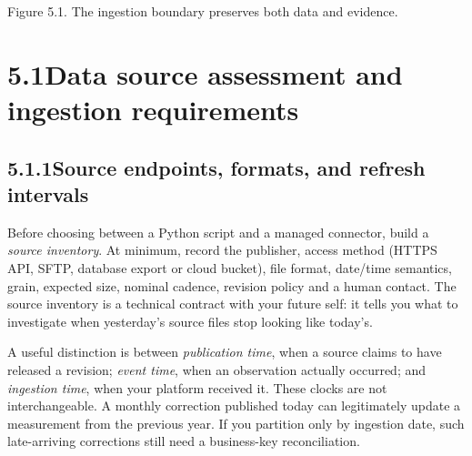 \documentclass[11pt,twoside]{article}
\newcommand{\topic}[2]{\subsection*{#1\quad #2}}
\begin{document}
\begin{center}
\par{\fontsize{8}{10}\selectfont\color{inkgray}Figure 5.1. The ingestion boundary preserves both data and evidence.}\end{center}
\newpage
\section*{5.1\quad Data source assessment and ingestion requirements}
\topic{5.1.1}{Source endpoints, formats, and refresh intervals}
Before choosing between a Python script and a managed connector, build a \emph{source inventory}. At minimum, record the publisher, access method (HTTPS API, SFTP, database export or cloud bucket), file format, date/time semantics, grain, expected size, nominal cadence, revision policy and a human contact. The source inventory is a technical contract with your future self: it tells you what to investigate when yesterday's source files stop looking like today's.

A useful distinction is between \emph{publication time}, when a source claims to have released a revision; \emph{event time}, when an observation actually occurred; and \emph{ingestion time}, when your platform received it. These clocks are not interchangeable. A monthly correction published today can legitimately update a measurement from the previous year. If you partition only by ingestion date, such late-arriving corrections still need a business-key reconciliation.
\end{document}

